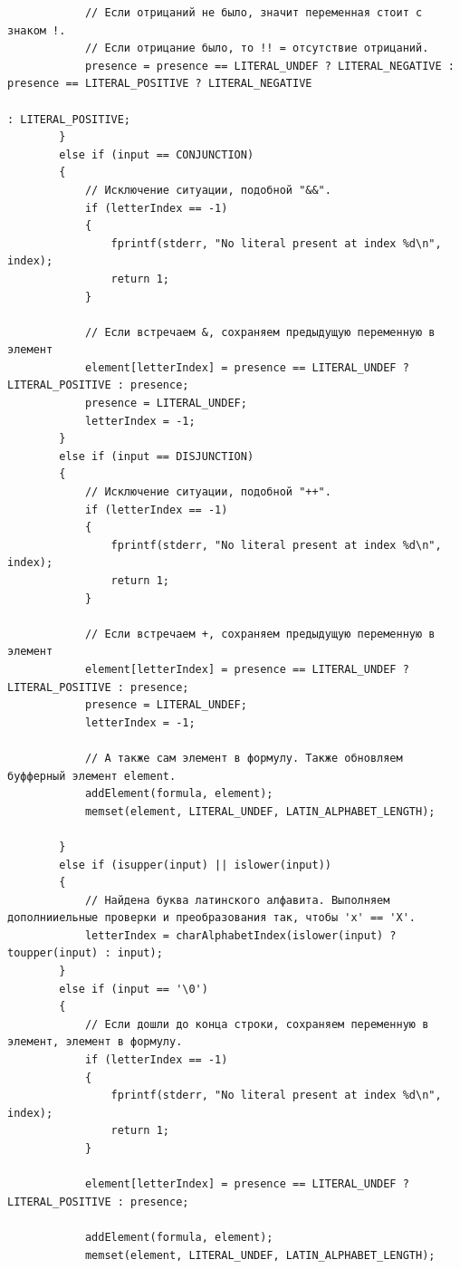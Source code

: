 \documentclass[a4paper,14pt]{extarticle}
\begin{document}
\begin{verbatim}
            // Если отрицаний не было, значит переменная стоит с знаком !.
            // Если отрицание было, то !! = отсутствие отрицаний.
            presence = presence == LITERAL_UNDEF ? LITERAL_NEGATIVE : presence == LITERAL_POSITIVE ? LITERAL_NEGATIVE
                                                                                                   : LITERAL_POSITIVE;
        }
        else if (input == CONJUNCTION)
        {
            // Исключение ситуации, подобной "&&".
            if (letterIndex == -1)
            {
                fprintf(stderr, "No literal present at index %d\n", index);
                return 1;
            }

            // Если встречаем &, сохраняем предыдущую переменную в элемент
            element[letterIndex] = presence == LITERAL_UNDEF ? LITERAL_POSITIVE : presence;
            presence = LITERAL_UNDEF;
            letterIndex = -1;
        }
        else if (input == DISJUNCTION)
        {
            // Исключение ситуации, подобной "++".
            if (letterIndex == -1)
            {
                fprintf(stderr, "No literal present at index %d\n", index);
                return 1;
            }

            // Если встречаем +, сохраняем предыдущую переменную в элемент
            element[letterIndex] = presence == LITERAL_UNDEF ? LITERAL_POSITIVE : presence;
            presence = LITERAL_UNDEF;
            letterIndex = -1;
            
            // А также сам элемент в формулу. Также обновляем буфферный элемент element.
            addElement(formula, element);
            memset(element, LITERAL_UNDEF, LATIN_ALPHABET_LENGTH);
            
        }
        else if (isupper(input) || islower(input))
        {
            // Найдена буква латинского алфавита. Выполняем дополнииельные проверки и преобразования так, чтобы 'x' == 'X'.
            letterIndex = charAlphabetIndex(islower(input) ? toupper(input) : input);
        }
        else if (input == '\0')
        {
            // Если дошли до конца строки, сохраняем переменную в элемент, элемент в формулу.
            if (letterIndex == -1)
            {
                fprintf(stderr, "No literal present at index %d\n", index);
                return 1;
            }

            element[letterIndex] = presence == LITERAL_UNDEF ? LITERAL_POSITIVE : presence;

            addElement(formula, element);
            memset(element, LITERAL_UNDEF, LATIN_ALPHABET_LENGTH);


\end{verbatim}
\end{document}
